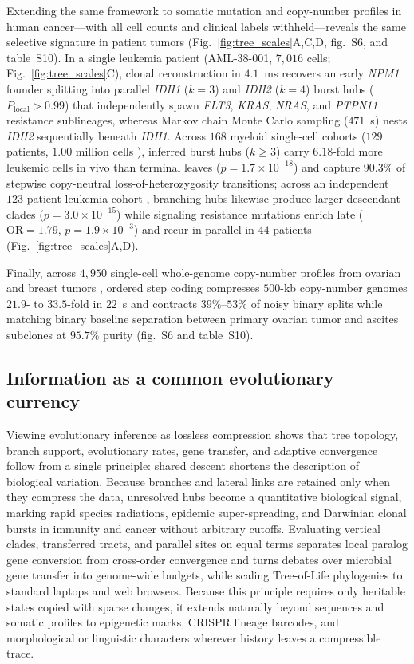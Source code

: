 \documentclass[12pt]{article}
\begin{document}
Extending the same framework to somatic mutation and copy-number profiles in human cancer---with all cell counts and clinical labels withheld---reveals the same selective signature in patient tumors (Fig.~\ref{fig:tree_scales}A,C,D, fig.~S6, and table~S10). In a single leukemia patient (AML-38-001, $7,016$ cells; Fig.~\ref{fig:tree_scales}C), clonal reconstruction in $4.1$~ms recovers an early \textit{NPM1} founder splitting into parallel \textit{IDH1} ($k=3$) and \textit{IDH2} ($k=4$) burst hubs ($P_{\mathrm{local}} > 0.99$) that independently spawn \textit{FLT3}, \textit{KRAS}, \textit{NRAS}, and \textit{PTPN11} resistance sublineages, whereas Markov chain Monte Carlo sampling ($471$~s) nests \textit{IDH2} sequentially beneath \textit{IDH1}. Across $168$ myeloid single-cell cohorts ($129$ patients, $1.00$ million cells \cite{sollier2023compass}), inferred burst hubs ($k \ge 3$) carry $6.18$-fold more leukemic cells in vivo than terminal leaves ($p = 1.7 \times 10^{-18}$) and capture $90.3\%$ of stepwise copy-neutral loss-of-heterozygosity transitions; across an independent $123$-patient leukemia cohort \cite{morita2020clonal}, branching hubs likewise produce larger descendant clades ($p = 3.0 \times 10^{-15}$) while signaling resistance mutations enrich late ($\mathrm{OR} = 1.79$, $p = 1.9 \times 10^{-3}$) and recur in parallel in $44$ patients (Fig.~\ref{fig:tree_scales}A,D).

Finally, across $4,950$ single-cell whole-genome copy-number profiles from ovarian and breast tumors \cite{salehi2023sitka}, ordered step coding compresses $500$-kb copy-number genomes $21.9$- to $33.5$-fold in $22$~s and contracts $39\%$--$53\%$ of noisy binary splits while matching binary baseline separation between primary ovarian tumor and ascites subclones at $95.7\%$ purity (fig.~S6 and table~S10).

\subsection*{Information as a common evolutionary currency}

Viewing evolutionary inference as lossless compression shows that tree topology, branch support, evolutionary rates, gene transfer, and adaptive convergence follow from a single principle: shared descent shortens the description of biological variation. Because branches and lateral links are retained only when they compress the data, unresolved hubs become a quantitative biological signal, marking rapid species radiations, epidemic super-spreading, and Darwinian clonal bursts in immunity and cancer without arbitrary cutoffs. Evaluating vertical clades, transferred tracts, and parallel sites on equal terms separates local paralog gene conversion from cross-order convergence and turns debates over microbial gene transfer into genome-wide budgets, while scaling Tree-of-Life phylogenies to standard laptops and web browsers. Because this principle requires only heritable states copied with sparse changes, it extends naturally beyond sequences and somatic profiles to epigenetic marks, CRISPR lineage barcodes, and morphological or linguistic characters wherever history leaves a compressible trace.
\end{document}
